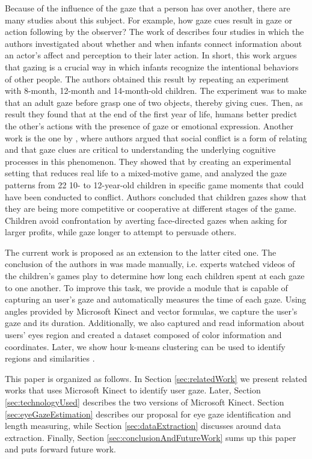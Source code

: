\documentclass[10pt, conference]{IEEEtran}
\begin{document}
	Because of the influence of the gaze that a person has over another, there are many studies about this subject. 
	For example, how gaze cues result in gaze or action following by the observer? 
	The work of \cite{5} describes four studies in which the authors investigated about whether and when infants connect information about an actor's affect and perception to their later action. 
	In short, this work argues that gazing is a crucial way in which infants recognize the intentional behaviors of other people. 
	The authors obtained this result by repeating an experiment with 8-month, 12-month and 14-month-old children. 
	The experiment was to make that an adult gaze before grasp one of two objects, thereby giving cues. 
	Then, as result they found that at the end of the first year of life, humans better predict the other's actions with the presence of gaze or emotional expression.
	Another work is the one by \cite{6}, where authors argued that social conflict is a form of relating and that gaze clues are critical to understanding the underlying cognitive processes in this phenomenon. 
	They showed that by creating an experimental setting that reduces real life to a mixed-motive game, and analyzed the gaze patterns from 22 10- to 12-year-old children in specific game moments that could have been conducted to conflict.
	Authors concluded that children gazes show that they are being more competitive or cooperative at different stages of the game.
	Children avoid confrontation by averting face-directed gazes when asking for larger profits, while gaze longer to attempt to persuade others.

	The current work is proposed as an extension to the latter cited one.
	The conclusion of the authors in \cite{6} was made manually, i.e. experts watched videos of the children's games play to determine how long each children spent at each gaze to one another.
	To improve this task, we provide a module that is capable of capturing an user's gaze and automatically measures the time of each gaze.
	Using angles provided by Microsoft Kinect and vector formulas, we capture the user's gaze and its duration.
	Additionally, we also captured and read information about users' eyes region and created a dataset composed of color information and coordinates.
	Later, we show hour k-means clustering can be used to identify regions and similarities .

	This paper is organized as follows.
	In Section \ref{sec:relatedWork} we present related works that uses Microsoft Kinect to identify user gaze.
	Later, Section \ref{sec:technologyUsed} describes the two versions of Microsoft Kinect.
	Section \ref{sec:eyeGazeEstimation} describes our proposal for eye gaze identification and length measuring, while Section \ref{sec:dataExtraction} discusses around data extraction.
	Finally, Section \ref{sec:conclusionAndFutureWork} sums up this paper and puts forward future work.
\end{document}
